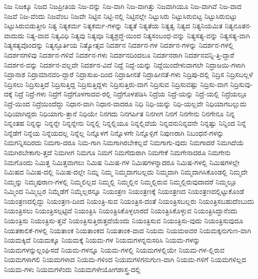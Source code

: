 {ನಿಜ
ನಿಜಕ್ಕೂ
ನಿಜದ
ನಿಜಪ್ರೀತಿಯ
ನಿಜ-ವನ್ನು
ನಿಜ-ವಾಗಿ
ನಿಜ-ವಾಗಿತ್ತು
ನಿಜವಾಗಿಯೂ
ನಿಜ-ವಾಗಿವೆ
ನಿಜ-ವಾದ
ನಿಜವೆ
ನಿಜ-ವೆಂದು
ನಿಜವೆಂಬ
ನಿಜವೇ
ನಿಟ್ಟಿನ
ನಿಟ್ಟಿ-ನಲ್ಲಿ
ನಿಟ್ಟಿನಲ್ಲೇ
ನಿಟ್ಟುಸಿರು
ನಿಟ್ಟುಸಿರುಬಿಟ್ಟ
ನಿಟ್ಟುಸಿರುಬಿಟ್ಟು
ನಿಟ್ಟುಸಿರುಬಿಡುತ್ತೀರಿ
ನಿತ್ಯ
ನಿತ್ಯಕರ್ಮ
ನಿತ್ಯಕರ್ಮ-ಗಳನ್ನು
ನಿತ್ಯತೆ
ನಿತ್ಯತೆಯ
ನಿತ್ಯತ್ವ
ನಿತ್ಯದ
ನಿತ್ಯನಿಯಮಿತ
ನಿತ್ಯನೂತನ-ವಾದುದು
ನಿತ್ಯ-ವಾದ
ನಿತ್ಯವಿಧಿ
ನಿತ್ಯವು
ನಿತ್ಯವೂ
ನಿತ್ಯಶ್ರದ್ಧೆ-ಯಿಂದ
ನಿತ್ಯಸಂಬಂಧ-ವನ್ನು
ನಿತ್ಯಸತ್ಯ-ವನ್ನು
ನಿತ್ಯಸತ್ಯ-ವಾಗಿ
ನಿತ್ಯಸತ್ಯವೊಂದನ್ನು
ನಿತ್ಯಸ್ಫೂರ್ತಿಯ
ನಿತ್ಯೋತ್ಸವ
ನಿದರ್ಶನ
ನಿದರ್ಶನ-ಗಳ
ನಿದರ್ಶನ-ಗಳನ್ನು
ನಿದರ್ಶನ-ಗಳಲ್ಲಿ
ನಿದರ್ಶನಗಳಿವು
ನಿದರ್ಶನ-ಗಳಿವೆ
ನಿದರ್ಶನ-ಗಳು
ನಿದರ್ಶನದಿಂದಲೂ
ನಿದರ್ಶನರಾಗಿ
ನಿದರ್ಶನವನ್ನಿ-ತ್ತಿ-ದ್ದಾರೆ
ನಿದರ್ಶನ-ವನ್ನು
ನಿದರ್ಶನ-ವಲ್ಲವೇ
ನಿದರ್ಶನ-ವಿದೆ
ನಿದ್ದೆ
ನಿದ್ದೆ-ಯನ್ನು
ನಿದ್ದೆಯಿಂದೇಳುವಾಗಲೇ
ನಿದ್ರಾಜಯಿ-ಗಳಾಗಿ
ನಿದ್ರಾನಾಶ
ನಿದ್ರಾಮಾನವರಿ-ದ್ದಾರೆ
ನಿದ್ರಾಸುಖ-ದಿಂದ
ನಿದ್ರಾಹೀನತೆ
ನಿದ್ರಾಹೀನತೆ-ಗಳು
ನಿದ್ರಿಪು-ದಲ್ಲಿ
ನಿದ್ರಿಸ
ನಿದ್ರಿಸಬಲ್ಲಳೆ
ನಿದ್ರಿಸಲು
ನಿದ್ರಿಸುತ್ತಿದೆ
ನಿದ್ರಿಸುತ್ತಿದ್ದ
ನಿದ್ರಿಸುತ್ತಿದ್ದಳು
ನಿದ್ರಿಸುತ್ತಿರು-ವಾಗ
ನಿದ್ರಿಸುವ
ನಿದ್ರಿಸುವಷ್ಟು
ನಿದ್ರಿಸು-ವಾಗ
ನಿದ್ರಿಸುವು-ದಕ್ಕೆ
ನಿದ್ರೆ
ನಿದ್ರೆ-ಗಳು
ನಿದ್ರೆಗೆ
ನಿದ್ರೆಗೊಳಗಾದವ-ರಲ್ಲಿ
ನಿದ್ರೆಗೊಳಪಡಿಸಿ
ನಿದ್ರೆಯ
ನಿದ್ರೆ-ಯನ್ನು
ನಿದ್ರೆ-ಯಲ್ಲಿ
ನಿದ್ರೆಯಲ್ಲೂ
ನಿದ್ರೆ-ಯಿಂದ
ನಿದ್ರೆಯಿಂದೆದ್ದು
ನಿಧಾನ-ವಾಗಿ
ನಿಧಾನ-ವಾದರೂ
ನಿಧಿ
ನಿಧಿ-ಯನ್ನು
ನಿಧಿ-ಯಲ್ಲವೇ
ನಿಧಿಯಾಗಬಲ್ಲುದು
ನಿಧಿಯಾಗಿದ್ದರು
ನಿಧಿಯಾಗು-ತ್ತಾನೆ
ನಿಧಿಯೇ
ನಿನಗದು
ನಿನಗರ್ಪಿತ
ನಿನಗೀಗ
ನಿನಗೆ
ನಿನಗೇನು
ನಿನಗೇನೂ
ನಿನ್ನ
ನಿನ್ನಂತಹ
ನಿನ್ನನ್ನು
ನಿನ್ನನ್ನೇ
ನಿನ್ನನ್ನೇನು
ನಿನ್ನಲ್ಲಿ
ನಿನ್ನಲ್ಲಿಯೂ
ನಿನ್ನಲ್ಲಿವೆಯೆ
ನಿನ್ನವನುನಿನ್ನವನೇ
ನಿನ್ನಷ್ಟು
ನಿನ್ನಿಂದ
ನಿನ್ನೆ
ನಿನ್ನೆಡೆಗೆ
ನಿನ್ನೆಯ
ನಿನ್ನೆಯದಲ್ಲ
ನಿನ್ನೆಲ್ಲ
ನಿನ್ನೊಳಗೆ
ನಿನ್ನೊಳಗೇ
ನಿನ್ನೊಳ್ಪಿಗೆ
ನಿಪುಣರಾಗಿ
ನಿಬಂಧನೆ-ಗಳನ್ನು
ನಿಮಗನ್ನಿಸದಿರದು
ನಿಮಗಾ-ದರೂ
ನಿಮ-ಗಾಗಿ
ನಿಮಗಾಗಿರಬೇಕಲ್ಲವೆ
ನಿಮಗಾಗು-ವುದು
ನಿಮಗಾದರೆ
ನಿಮಗಿದೆಯೆ
ನಿಮಗಿರಬೇಕಾಗು-ತ್ತದೆ
ನಿಮಗೀಗ
ನಿಮಗೂ
ನಿಮಗೆ
ನಿಮಗೆದುರಾಗಿ
ನಿಮಗೇಕೆ
ನಿಮಗೇನಾದರೂ
ನಿಮಗೇನು
ನಿಮಗೊಂದು
ನಿಮಿತ್ತ
ನಿಮಿತ್ತವಾಗಲು
ನಿಮಿಷ
ನಿಮಿಷ-ಗಳ
ನಿಮಿಷಗಳನ್ನಾದರೂ
ನಿಮಿಷ-ಗಳಲ್ಲಿ
ನಿಮಿಷಗಳಲ್ಲೇ
ನಿಮಿಷದ
ನಿಮಿಷ-ದಲ್ಲಿ
ನಿಮಿಷ-ದಲ್ಲೇ
ನಿಮ್ನ
ನಿಮ್ಮ
ನಿಮ್ಮದಾಗಬಲ್ಲದು
ನಿಮ್ಮದಾಗಿ
ನಿಮ್ಮದಾಗಿಸಿಕೊಂಡಲ್ಲಿ
ನಿಮ್ಮದೇ
ನಿಮ್ಮನ್ನು
ನಿಮ್ಮಪುರಾಣ-ಗಳಲ್ಲಿ
ನಿಮ್ಮಲಿಲ್ಲದ
ನಿಮ್ಮಲ್ಲಿ
ನಿಮ್ಮಲ್ಲಿನ
ನಿಮ್ಮಲ್ಲಿರುವ
ನಿಮ್ಮಲ್ಲಿರುವುದಾದರೆ
ನಿಮ್ಮಲ್ಲೂ
ನಿಮ್ಮಿಂದ
ನಿಮ್ಮಿಬ್ಬರ
ನಿಮ್ಮೆಡೆಗೆ
ನಿಮ್ಮೆಲ್ಲರನ್ನೂ
ನಿಯಂತ್ರಣ
ನಿಯಂತ್ರಣಕ್ಕೆ
ನಿಯಂತ್ರಣದ
ನಿಯಂತ್ರಣದಲ್ಲಿಟ್ಟುಕೊಂಡೆ
ನಿಯಂತ್ರಣದಲ್ಲಿದ್ದು
ನಿಯಂತ್ರಣ-ದಿಂದ
ನಿಯಂತ್ರಿ-ಸುವ
ನಿಯಂತ್ರಿಸ-ದಂತೆ
ನಿಯಂತ್ರಿಸಬಲ್ಲರು
ನಿಯಂತ್ರಿಸಬಹುದೆಂಬುದು
ನಿಯಂತ್ರಿಸಲು
ನಿಯಂತ್ರಿಸಲ್ಪಟ್ಟಿದೆ
ನಿಯಂತ್ರಿಸಿ
ನಿಯಂತ್ರಿಸಿಕೊಳ್ಳಲಾರದೆ
ನಿಯಂತ್ರಿಸಿಕೊಳ್ಳುವ
ನಿಯಂತ್ರಿಸಿದ್ದಾನೆಂದು
ನಿಯಂತ್ರಿಸು
ನಿಯಂತ್ರಿಸು-ತ್ತವೆ
ನಿಯಂತ್ರಿಸುತ್ತಿರುತ್ತದೆಯೆಂದು
ನಿಯಂತ್ರಿಸುವ
ನಿಯಂತ್ರಿಸು-ವುದು
ನಿಯಂತ್ರಿಸುವುದೂ
ನಿಯತಕಾಲಿಕೆ-ಗಳಲ್ಲಿ
ನಿಯತಾಂಕ
ನಿಯತಾಂಕದ
ನಿಯತಾಂಕ-ವಾದ
ನಿಯಮ
ನಿಯಮಅವರ
ನಿಯಮಕ್ಕನುಗುಣ-ವಾಗಿ
ನಿಯಮಕ್ಕಿದೆ
ನಿಯಮಕ್ಕೂ
ನಿಯಮಕ್ಕೆ
ನಿಯಮ-ಗಳ
ನಿಯಮಗಳನ್ನನುಸರಿಸಿ
ನಿಯಮ-ಗಳನ್ನು
ನಿಯಮಗಳನ್ನುಲ್ಲಂಘಿಸದೆ
ನಿಯಮ-ಗಳನ್ನೂ
ನಿಯಮ-ಗಳಲ್ಲಿ
ನಿಯಮಗಳಲ್ಲಿಯೇ
ನಿಯಮ-ಗಳ-ಲ್ಲಿರುವ
ನಿಯಮಗಳಾಗಲಿ
ನಿಯಮಗಳಾದ
ನಿಯಮ-ಗಳಿಂದ
ನಿಯಮಗಳಿಗನುಗುಣ-ವಾಗಿ
ನಿಯಮ-ಗಳಿಗೆ
ನಿಯಮಗಳಿಲ್ಲದ
ನಿಯಮ-ಗಳು
ನಿಯಮಗಳೆಂದು
ನಿಯಮಗಳೇಯೋಗಶಾಸ್ತ್ರ-ದಲ್ಲಿ
}

